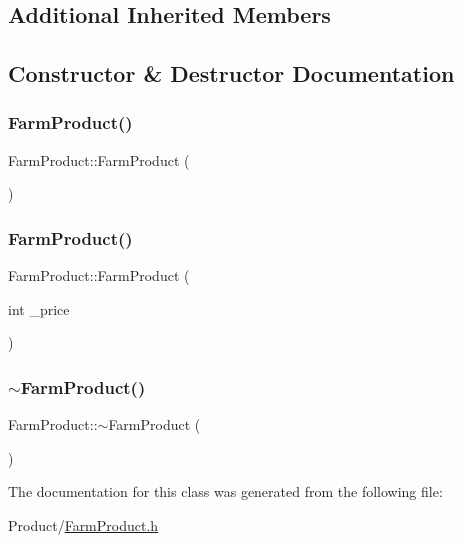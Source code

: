 \subsection*{Additional Inherited Members}


\subsection{Constructor \& Destructor Documentation}
\mbox{\label{classFarmProduct_a2eefa1f8ab8f2437b97e18026ecdc8a4}} 
\subsubsection{\texorpdfstring{FarmProduct()}{FarmProduct()}\hspace{0.1cm}{\footnotesize\ttfamily [1/2]}}
{\footnotesize\ttfamily Farm\+Product\+::\+Farm\+Product (\begin{DoxyParamCaption}{ }\end{DoxyParamCaption})}

\mbox{\label{classFarmProduct_aa476fed2ddced2d6f872a17f887c24e5}} 
\subsubsection{\texorpdfstring{FarmProduct()}{FarmProduct()}\hspace{0.1cm}{\footnotesize\ttfamily [2/2]}}
{\footnotesize\ttfamily Farm\+Product\+::\+Farm\+Product (\begin{DoxyParamCaption}\item[{int}]{\+\_\+price }\end{DoxyParamCaption})}

\mbox{\label{classFarmProduct_aabc3f4da34b474619e38e5c602490d2d}} 
\subsubsection{\texorpdfstring{$\sim$FarmProduct()}{~FarmProduct()}}
{\footnotesize\ttfamily Farm\+Product\+::$\sim$\+Farm\+Product (\begin{DoxyParamCaption}{ }\end{DoxyParamCaption})}



The documentation for this class was generated from the following file\+:\begin{DoxyCompactItemize}
\item 
Product/\mbox{\hyperlink{FarmProduct_8h}{Farm\+Product.\+h}}\end{DoxyCompactItemize}
